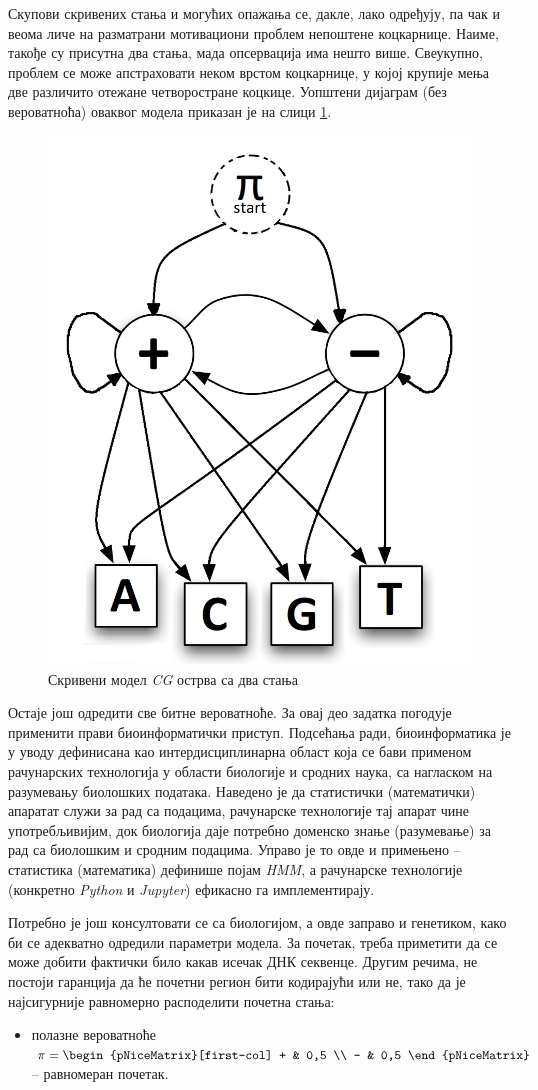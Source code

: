 \documentclass[12pt,oneside]{memoir}
\begin{document}
\begin{CJK}{UTF8}{ipxm}
Скупови скривених стања и могућих опажања се, дакле, лако одређују, па чак и веома личе на разматрани мотивациони проблем непоштене коцкарнице. Наиме, такође су присутна два стања, мада опсервација има нешто више. Свеукупно, проблем се може апстраховати неком врстом коцкарнице, у којој крупије мења две различито отежане четворостране коцкице. Уопштени дијаграм (без вероватноћа) оваквог модела приказан је на слици \ref{fig:cg_graf}.

\begin{figure}[H]
  \centering
  \includegraphics[width=.5\textwidth]{cg_graf.png}
  \caption{Скривени модел \textit{CG} острва са два стања}
  \label{fig:cg_graf}
\end{figure}

Остаје још одредити све битне вероватноће. За овај део задатка погодује применити прави биоинформатички приступ. Подсећања ради, биоинформатика је у уводу дефинисана као интердисциплинарна област која се бави применом рачунарских технологија у области биологије и сродних наука, са нагласком на разумевању биолошких података. Наведено је да статистички (математички) апаратат служи за рад са подацима, рачунарске технологије тај апарат чине употребљивијим, док биологија даје потребно доменско знање (разумевање) за рад са биолошким и сродним подацима. Управо је то овде и примењено -- статистика (математика) дефинише појам \textit{HMM}, а рачунарске технологије (конкретно \textit{Python} и \textit{Jupyter}) ефикасно га имплементирају.

Потребно је још консултовати се са биологијом, а овде заправо и генетиком, како би се адекватно одредили параметри модела. За почетак, треба приметити да се може добити фактички било какав исечак ДНК секвенце. Другим речима, не постоји гаранција да ће почетни регион бити кодирајући или не, тако да је најсигурније равномерно расподелити почетна стања:
\begin{itemize}
  \item полазне вероватноће $\pi = \begin{pNiceMatrix}[first-col] + & 0,5 \\ - & 0,5 \end{pNiceMatrix}$ -- равномеран почетак.
\end{itemize}


\end{CJK}
\end{document}
